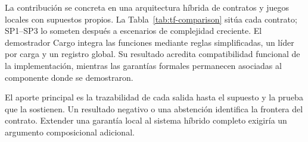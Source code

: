 La contribución se concreta en una arquitectura híbrida de contratos y juegos locales con supuestos propios. La Tabla~\ref{tab:tf-comparison} sitúa cada contrato; SP1--SP3 lo someten después a escenarios de complejidad creciente. El demostrador Cargo integra las funciones mediante reglas simplificadas, un líder por carga y un registro global. Su resultado acredita compatibilidad funcional de la implementación, mientras las garantías formales permanecen asociadas al componente donde se demostraron.

El aporte principal es la trazabilidad de cada salida hasta el supuesto y la prueba que la sostienen. Un resultado negativo o una abstención identifica la frontera del contrato. Extender una garantía local al sistema híbrido completo exigiría un argumento composicional adicional.
